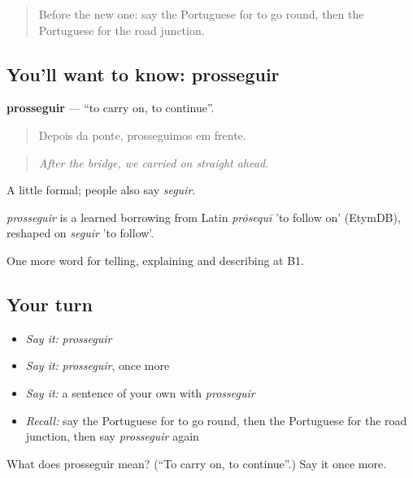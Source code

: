 \label{lesson:PT-C436-prosseguir}



\begin{quote}
Before the new one: say the Portuguese for to go round, then the Portuguese for the road junction.
\end{quote}

\subsection*{You'll want to know: prosseguir}
\textbf{prosseguir} — \textquotedblleft{}to carry on, to continue\textquotedblright{}.

\begin{quote}
Depois da ponte, prosseguimos em frente.
\end{quote}

\begin{quote}
\emph{After the bridge, we carried on straight ahead.}
\end{quote}

A little formal; people also say \emph{seguir}.

\begin{cousinweb}
\emph{prosseguir} is a learned borrowing from Latin \emph{prōsequī} 'to follow on' (EtymDB), reshaped on \emph{seguir} 'to follow'.
\end{cousinweb}

\begin{grammarlens}[title={What you've built}]
One more word for telling, explaining and describing at B1.
\end{grammarlens}

\subsection*{Your turn}
\begin{itemize}
\raggedright
  \item \emph{Say it:} \emph{prosseguir}
  \item \emph{Say it:} \emph{prosseguir}, once more
  \item \emph{Say it:} a sentence of your own with \emph{prosseguir}
  \item \emph{Recall:} say the Portuguese for to go round, then the Portuguese for the road junction, then say \emph{prosseguir} again
\end{itemize}

\begin{tcolorbox}[breakable,colback=teal!4,colframe=teal!35!black,title={Before you move on}]
What does prosseguir mean? (\textquotedblleft{}To carry on, to continue\textquotedblright{}.) Say it once more.
\end{tcolorbox}
